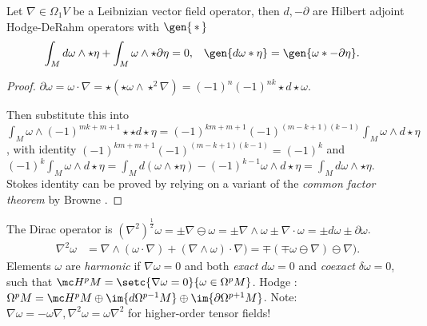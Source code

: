 \documentclass{juliacon}
\begin{document}
\begin{theorem}
	Let $ \nabla \in\Omega_1 V $ be a Leibnizian vector field operator, then $d,-\partial$ are Hilbert adjoint Hodge-DeRahm operators with $\gen{\,\ast\,}$
	\begin{align*}
		\int_M d\omega\wedge\star\eta +\int_M \omega\wedge\star\partial\eta &= 0, & \gen{d\omega\ast\eta} &=\gen{\omega\ast-\partial\eta}.
	\end{align*}
\end{theorem}
\begin{proof}
	$\partial\omega = \omega\cdot\nabla = \star(\star\omega\wedge\star^2\nabla) = (-1)^n(-1)^{nk}\star d\star\omega$.


	Then  substitute this into $\int_M \omega\wedge(-1)^{mk+m+1}\star\star d\star\eta = (-1)^{km+m+1}(-1)^{(m-k+1)(k-1)}\int_M\omega\wedge d\star\eta$,
	with identity $(-1)^{km+m+1}(-1)^{(m-k+1)(k-1)}=(-1)^k$ and
	$ (-1)^k\int_M\omega\wedge d\star\eta = \int_M d(\omega\wedge\star\eta) - (-1)^{k-1}\omega\wedge d\star\eta = \int_M d\omega\wedge\star\eta$.
	Stokes identity can be proved by relying on a variant of the \textit{common factor theorem} by Browne \cite{browne}.
\end{proof}
\begin{theorem}
	The Dirac operator \cite{garling} is $ (\nabla^2)^\frac12\omega = \pm\nabla\ominus\omega = \pm\nabla\wedge\omega \pm \nabla\cdot\omega  = \pm d\omega\pm\partial\omega$.
	\begin{align*}
		\nabla^2\omega &= \nabla\wedge(\omega\cdot\nabla) + (\nabla\wedge\omega)\cdot\nabla) = \mp(\mp\omega\ominus\nabla)\ominus\nabla).
	\end{align*}
	Elements $\omega$ are \textit{harmonic} if $\nabla\omega = 0$ and both \textit{exact} $d\omega=0$ and \textit{coexact} $\delta\omega=0$, such that $\mc H^p M = \setc{\nabla\omega = 0}{\omega\in \Omega^pM}$.
	Hodge \cite{ivancevic}:
	$\Omega^pM=\mc H^pM\oplus\im{d\Omega^{p-1}M}\oplus\im{\partial\Omega^{p+1}M}$.
	Note: $\nabla\omega=-\omega\nabla, \nabla^2\omega=\omega\nabla^2$ for higher-order tensor fields!
\end{theorem}

\end{document}
